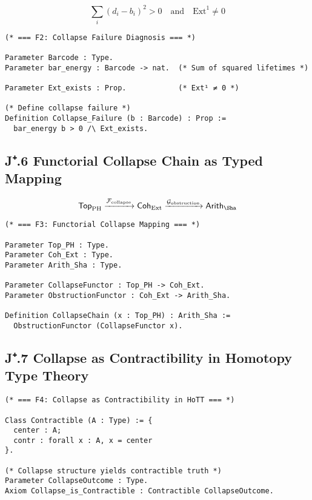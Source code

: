 \documentclass[11pt]{article}
\theoremstyle{definition}
\begin{document}
\[
\sum_i (d_i - b_i)^2 > 0 \quad \text{and} \quad \mathrm{Ext}^1 \neq 0
\]

\begin{lstlisting}[language=Coq, caption=Collapse Failure Zone as Type-Theoretic Predicate]
(* === F2: Collapse Failure Diagnosis === *)

Parameter Barcode : Type.
Parameter bar_energy : Barcode -> nat.  (* Sum of squared lifetimes *)

Parameter Ext_exists : Prop.            (* Ext¹ ≠ 0 *)

(* Define collapse failure *)
Definition Collapse_Failure (b : Barcode) : Prop :=
  bar_energy b > 0 /\ Ext_exists.
\end{lstlisting}

\subsection*{J⁺.6 Functorial Collapse Chain as Typed Mapping}

\[
\mathsf{Top}_{\mathrm{PH}} \xrightarrow{\mathcal{F}_{\mathrm{collapse}}}
\mathsf{Coh}_{\mathrm{Ext}} \xrightarrow{\mathcal{G}_{\mathrm{obstruction}}}
\mathsf{Arith}_{\Sha}
\]

\begin{lstlisting}[language=Coq, caption=Typed Functorial Collapse Chain]
(* === F3: Functorial Collapse Mapping === *)

Parameter Top_PH : Type.
Parameter Coh_Ext : Type.
Parameter Arith_Sha : Type.

Parameter CollapseFunctor : Top_PH -> Coh_Ext.
Parameter ObstructionFunctor : Coh_Ext -> Arith_Sha.

Definition CollapseChain (x : Top_PH) : Arith_Sha :=
  ObstructionFunctor (CollapseFunctor x).
\end{lstlisting}

\subsection*{J⁺.7 Collapse as Contractibility in Homotopy Type Theory}

\begin{lstlisting}[language=Coq, caption=Collapse Terminal State as Contractible Type]
(* === F4: Collapse as Contractibility in HoTT === *)

Class Contractible (A : Type) := {
  center : A;
  contr : forall x : A, x = center
}.

(* Collapse structure yields contractible truth *)
Parameter CollapseOutcome : Type.
Axiom Collapse_is_Contractible : Contractible CollapseOutcome.
\end{lstlisting}
\end{document}
